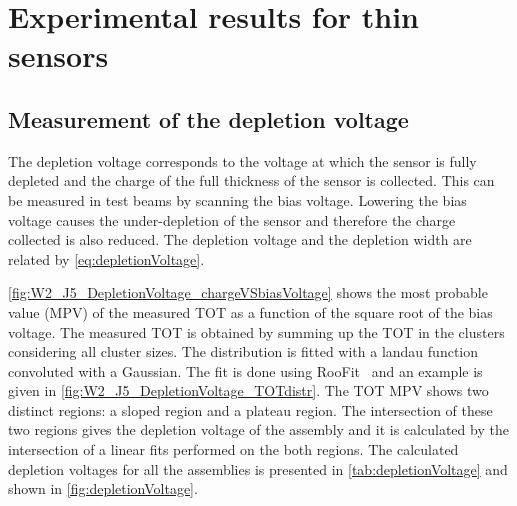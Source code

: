 
\section{Experimental results for thin sensors}

\subsection{Measurement of the depletion voltage}

The depletion voltage corresponds to the voltage at which the sensor
is fully depleted and the charge of the full thickness of the sensor
is collected. This can be measured in test beams by scanning the bias
voltage. Lowering the bias voltage causes the under-depletion of the
sensor and therefore the charge collected is also reduced. The
depletion voltage and the depletion width are related by
\cref{eq:depletionVoltage}. 

\cref{fig:W2_J5_DepletionVoltage_chargeVSbiasVoltage} shows the most
probable value (MPV) of the measured TOT as a function of the square
root of the bias voltage. The measured TOT is obtained by summing up
the TOT in the clusters considering all cluster sizes. The
distribution is fitted with a landau function convoluted with a
Gaussian. The fit is done using RooFit~\cite{Cranmer:2012sba} and an
example is given in \cref{fig:W2_J5_DepletionVoltage_TOTdistr}. The
TOT MPV shows two distinct regions: a sloped region and a plateau
region. The intersection of these two regions gives the depletion
voltage of the assembly and it is calculated by the intersection of a
linear fits performed on the both regions. The calculated depletion
voltages for all the assemblies is presented in
\cref{tab:depletionVoltage} and shown in \cref{fig:depletionVoltage}.

